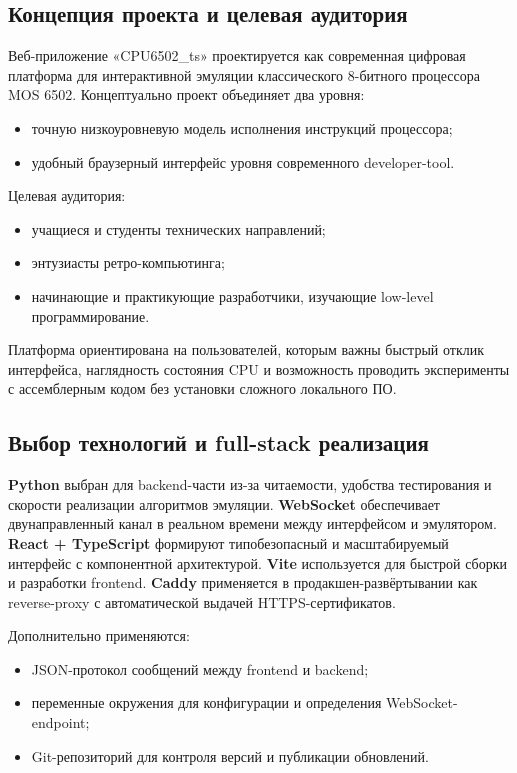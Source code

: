 \documentclass[12pt,a4paper]{article}
\begin{document}
\subsection{Концепция проекта и целевая аудитория}
Веб-приложение «CPU6502\_ts» проектируется как современная цифровая платформа для интерактивной эмуляции классического 8-битного процессора MOS 6502. Концептуально проект объединяет два уровня:
\begin{itemize}
  \item точную низкоуровневую модель исполнения инструкций процессора;
  \item удобный браузерный интерфейс уровня современного developer-tool.
\end{itemize}

Целевая аудитория:
\begin{itemize}
  \item учащиеся и студенты технических направлений;
  \item энтузиасты ретро-компьютинга;
  \item начинающие и практикующие разработчики, изучающие low-level программирование.
\end{itemize}

Платформа ориентирована на пользователей, которым важны быстрый отклик интерфейса, наглядность состояния CPU и возможность проводить эксперименты с ассемблерным кодом без установки сложного локального ПО.

\subsection{Выбор технологий и full-stack реализация}
\textbf{Python} выбран для backend-части из-за читаемости, удобства тестирования и скорости реализации алгоритмов эмуляции.\newline
\textbf{WebSocket} обеспечивает двунаправленный канал в реальном времени между интерфейсом и эмулятором.\newline
\textbf{React + TypeScript} формируют типобезопасный и масштабируемый интерфейс с компонентной архитектурой.\newline
\textbf{Vite} используется для быстрой сборки и разработки frontend.\newline
\textbf{Caddy} применяется в продакшен-развёртывании как reverse-proxy с автоматической выдачей HTTPS-сертификатов.

Дополнительно применяются:
\begin{itemize}
  \item JSON-протокол сообщений между frontend и backend;
  \item переменные окружения для конфигурации и определения WebSocket-endpoint;
  \item Git-репозиторий для контроля версий и публикации обновлений.
\end{itemize}
\end{document}
